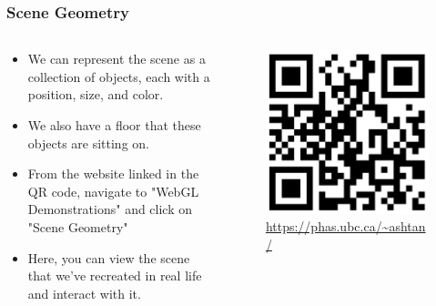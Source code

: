 \documentclass[12pt]{beamer}
\begin{document}
  \begin{frame}
    \frametitle{Scene Geometry}
    \begin{columns}
      \begin{column}{0.6\textwidth}
        \begin{itemize}
          \item We can represent the scene as a collection of objects, each with a position, size, and color.
          \item We also have a floor that these objects are sitting on.
          \item From the website linked in the QR code, navigate to "WebGL Demonstrations" and click on "Scene Geometry"
          \item Here, you can view the scene that we've recreated in real life and interact with it.
        \end{itemize}
      \end{column}
      \begin{column}{0.4\textwidth}
        \begin{figure}
          \centering
          \includegraphics[width=\linewidth]{qr.png}
          \caption{\url{https://phas.ubc.ca/~ashtan/}}
        \end{figure}
      \end{column}
    \end{columns}
  \end{frame}
\end{document}
